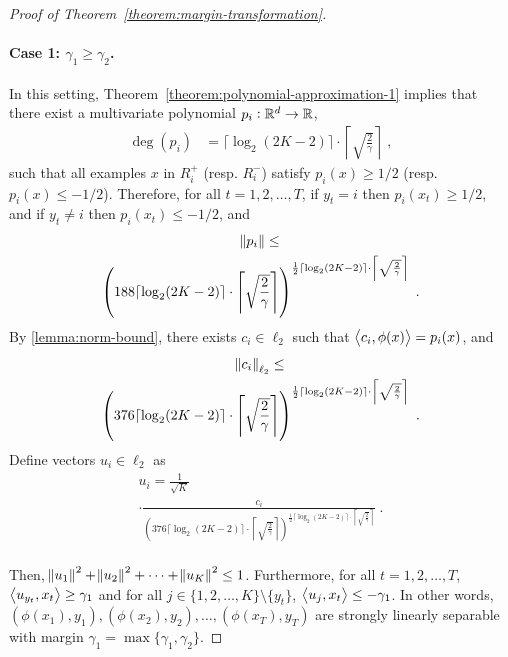 \begin{proof}[Proof of Theorem~\ref{theorem:margin-transformation}]
\paragraph{Case 1: $\gamma_1 \geq \gamma_2$.} In this setting, Theorem~\ref{theorem:polynomial-approximation-1}
implies that there exist a multivariate polynomial $p_i:\mathbb{R}^d \to \mathbb{R}$,
\begin{align*}
\deg(p_i) & = \lceil \log_2(2K-2) \rceil \cdot \left\lceil \sqrt{\frac{2}{\gamma}} \right\rceil \; ,
\end{align*}
such that all examples $x$ in $R_i^+$ (resp. $R_i^-$) satisfy $p_i(x) \geq 1/2$
(resp. $p_i(x) \leq -1/2$).
Therefore, for all $t=1,2,\dots,T$, if $y_t = i$ then $p_i(x_t) \ge 1/2$,
 and if $y_t \neq i$ then $p_i(x_t) \le -1/2$, and
\begin{multline*}
\norm{p_i} \le \\
\left(188 \lceil \log_2(2K-2) \rceil \cdot \left \lceil \sqrt{\frac{2}{\gamma}} \right \rceil \right)^{\frac{1}{2} \lceil \log_2(2K-2) \rceil
\cdot \left \lceil \sqrt{\frac{2}{\gamma}} \right \rceil} \; .
\end{multline*}
By \autoref{lemma:norm-bound}, there exists $c_i \in \ell_2$ such that
$\left\langle c_i, \phi(x) \right\rangle = p_i(x)$, and
\begin{multline*}
\norm{c_i}_{\ell_2} \le \\
\left(376 \lceil \log_2(2K-2) \rceil \cdot \left \lceil \sqrt{\frac{2}{\gamma}} \right \rceil \right)^{\frac{1}{2} \lceil \log_2(2K-2) \rceil
\cdot \left \lceil \sqrt{\frac{2}{\gamma}} \right \rceil} \; .
\end{multline*}
Define vectors $u_i \in \ell_2$ as
\begin{multline*}
u_i = \frac{1}{\sqrt{K}} \\
\cdot \frac{c_i}{\left(376 \lceil \log_2(2K-2) \rceil \cdot \left \lceil \sqrt{\frac{2}{\gamma}} \right \rceil \right)^{\frac{1}{2} \lceil \log_2(2K-2) \rceil
\cdot \left \lceil \sqrt{\frac{2}{\gamma}} \right \rceil}} \; . \\
\end{multline*}

Then, $\norm{u_1}^2 + \norm{u_2}^2 + \dots + \norm{u_K}^2 \le 1$.
Furthermore, for all $t=1,2,\dots,T$, $\left\langle u_{y_t}, x_t \right\rangle \ge \gamma_1$
and for all $j \in \{1,2,\dots,K\} \setminus \{y_t\}$,
$\left\langle u_j, x_t \right\rangle \le - \gamma_1$. In other words,
$(\phi(x_1), y_1), (\phi(x_2), y_2), \dots, (\phi(x_T), y_T)$ are
strongly linearly separable with margin $\gamma_1 = \max\{\gamma_1, \gamma_2\}$.


\end{proof}
